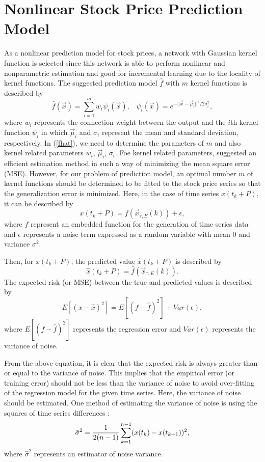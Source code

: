\documentclass[runningheads,a4paper]{llncs}
\begin{document}
\section{Nonlinear Stock Price Prediction Model}

As a nonlinear prediction model for stock prices, a network with Gaussian kernel function is selected since this network
is able to perform nonlinear and nonparametric estimation and good for incremental learning due to the locality of kernel functions.
The suggested prediction model $\hat{f}$ with $m$ kernel functions is described by
\begin{equation}
\hat{f}(\vec{x})=\sum_{i=1}^mw_i\psi_i(\vec{x}), \;\;\; \psi_i(\vec{x}) = e^{-||\vec{x}-\vec{\mu}_i||^2/2\sigma_i^2},
\label{fhat}
\end{equation}
where $w_i$ represents the connection weight between the output and the $i$th kernel function $\psi_i$ in which
$\vec{\mu}_i$ and $\sigma_i$ represent the mean and standard deviation, respectively.
In (\ref{fhat}), we need to determine the parameters of $m$ and also kernel related parameters $w_i$, $\vec{\mu}_i$, $\sigma_i$.
Foe kernel related parameters, \cite{Kil93} suggested an efficient estimation method in such a way of minimizing
the mean square error (MSE). However, for our problem of prediction model, an optimal number $m$ of kernel functions should be determined to be fitted to
the stock price series so that the generalization error is minimized. Here, in the case of time series $x(t_k+P)$, it can be described by
\begin{equation}
x(t_k+P) = f(\vec{x}_{\tau,E}(k)) + \epsilon,
\end{equation}
where $f$ represent an embedded function for the generation of time series data and $\epsilon$ represents
a noise term expressed as a random variable with mean 0 and variance $\sigma^2$.

Then, for $x(t_k+P)$, the predicted value $\hat{x}(t_k+P)$ is described by
\begin{equation}
\hat{x}(t_k+P) = \hat{f}(\vec{x}_{\tau,E}(k)).
\end{equation}
The expected risk (or MSE) between the true and predicted values is described by
\begin{equation}
E[(x-\hat{x})^2] = E[(f - \hat{f})^2] + Var(\epsilon),
\label{risk}
\end{equation}
where $E[(f - \hat{f})^2]$ represents the regression error and  $Var(\epsilon)$ represents
the variance of noise.

From the above equation, it is clear that the expected risk is always greater than or equal to the variance of
noise. This implies that the empirical error (or training error) should not be less than the variance of noise
to avoid over-fitting of the regression model for the given time series. Here,  the variance of noise should be estimated.
One method of estimating the variance of noise is using the squares of time series differences \cite{rice}:
\begin{equation}
\hat{\sigma}^2={1\over{2(n-1)}}\sum_{k=1}^{n-1}(x(t_k) - x(t_{k-1}))^2,
\label{est_var}
\end{equation}
where $\hat{\sigma}^2$ represents an estimator of noise variance.
\end{document}
